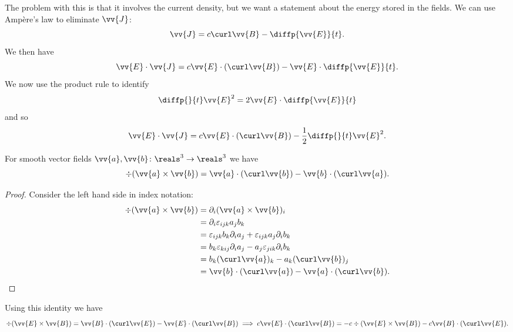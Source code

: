 The problem with this is that it involves the current density, but we want a statement about the energy stored in the fields.
We can use Amp\`ere's law to eliminate \(\vv{J}\):
\begin{equation}
    \vv{J} = c\curl\vv{B} - \diffp{\vv{E}}{t}.
\end{equation}
We then have
\begin{equation}
    \vv{E} \cdot \vv{J} = c\vv{E} \cdot (\curl \vv{B}) - \vv{E} \cdot \diffp{\vv{E}}{t}.
\end{equation}
We now use the product rule to identify
\begin{equation}
    \diffp{}{t} \vv{E}^2 = 2\vv{E} \cdot \diffp{\vv{E}}{t}
\end{equation}
and so
\begin{equation}
    \vv{E} \cdot \vv{J} = c\vv{E} \cdot (\curl \vv{B}) - \frac{1}{2}\diffp{}{t}\vv{E}^2.
\end{equation}
\begin{lma}{}{}
    For smooth vector fields \(\vv{a}, \vv{b} \colon \reals^3 \to \reals^3\) we have
    \begin{equation}
        \div(\vv{a} \times \vv{b}) = \vv{a} \cdot (\curl \vv{b}) - \vv{b} \cdot (\curl \vv{a}).
    \end{equation}
    \begin{proof}
        Consider the left hand side in index notation:
        \begin{align}
            \div(\vv{a} \times \vv{b}) &= \partial_i(\vv{a}\times\vv{b})_i\\
            &= \partial_i\varepsilon_{ijk}a_jb_k\\
            &= \varepsilon_{ijk}b_k\partial_ia_j + \varepsilon_{ijk}a_j\partial_ib_k\\
            &= b_k\varepsilon_{kij}\partial_ia_j - a_j\varepsilon_{jik}\partial_ib_k\\
            &= b_k(\curl \vv{a})_k - a_k(\curl \vv{b})_j\\
            &= \vv{b} \cdot (\curl \vv{a}) - \vv{a} \cdot (\curl \vv{b}).\qedhere
        \end{align}
    \end{proof}
\end{lma}
Using this identity we have
\begin{equation}
    \div(\vv{E} \times \vv{B}) = \vv{B} \cdot (\curl \vv{E}) - \vv{E} \cdot (\curl \vv{B}) \implies c\vv{E} \cdot (\curl\vv{B}) = -c\div(\vv{E} \times \vv{B}) - c\vv{B} \cdot (\curl \vv{E}).
\end{equation}
